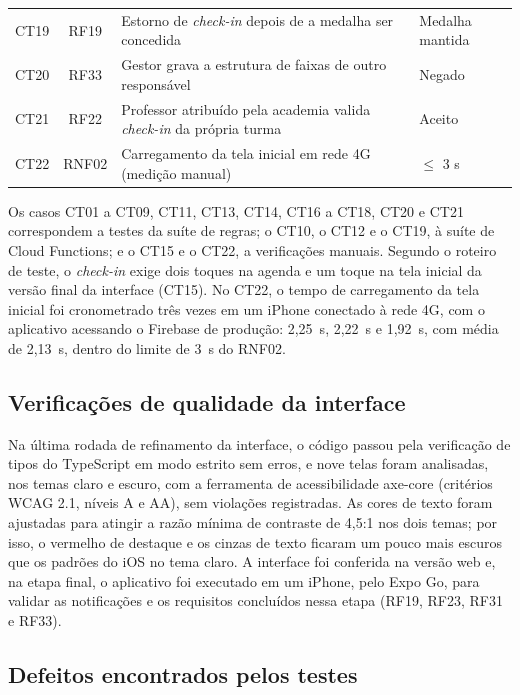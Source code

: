 \begin{table}[H]
\begin{tabular}{ccp{6.0cm}p{3.2cm}}
    CT19 & RF19 & Estorno de \textit{check-in} depois de a medalha ser concedida & Medalha mantida \\
    CT20 & RF33 & Gestor grava a estrutura de faixas de outro responsável & Negado \\
        CT21 & RF22 & Professor atribuído pela academia valida \textit{check-in} da própria turma & Aceito \\
    CT22 & RNF02 & Carregamento da tela inicial em rede 4G (medição manual) & $\leq$ 3 s \\
    \bottomrule
  \end{tabular}
\end{table}

Os casos CT01 a CT09, CT11, CT13, CT14, CT16 a CT18, CT20 e CT21
correspondem a testes da suíte de regras; o CT10, o CT12 e o CT19, à
suíte de Cloud Functions; e o CT15 e o CT22, a verificações manuais.
Segundo o roteiro de teste, o \textit{check-in} exige dois toques na
agenda e um toque na tela inicial da versão final da interface (CT15).
No CT22, o tempo de carregamento da tela inicial foi cronometrado três
vezes em um iPhone conectado à rede 4G, com o aplicativo acessando o
Firebase de produção: 2,25~s, 2,22~s e 1,92~s, com média de 2,13~s,
dentro do limite de 3~s do RNF02.

\subsection{Verificações de qualidade da interface}

Na última rodada de refinamento da interface, o código passou pela
verificação de tipos do TypeScript em modo estrito sem erros, e nove
telas foram analisadas, nos temas claro e escuro, com a ferramenta de
acessibilidade axe-core (critérios WCAG 2.1, níveis A e AA), sem violações
registradas. As cores de texto foram ajustadas para atingir a razão
mínima de contraste de 4,5:1 nos dois temas; por isso, o vermelho de
destaque e os cinzas de texto ficaram um pouco mais escuros que os
padrões do iOS no tema claro. A interface foi conferida na versão web e, na etapa final, o
aplicativo foi executado em um iPhone, pelo Expo Go, para validar as
notificações e os requisitos concluídos nessa etapa (RF19, RF23, RF31 e
RF33).

\subsection{Defeitos encontrados pelos testes}
\label{sec:defeitos-testes}

